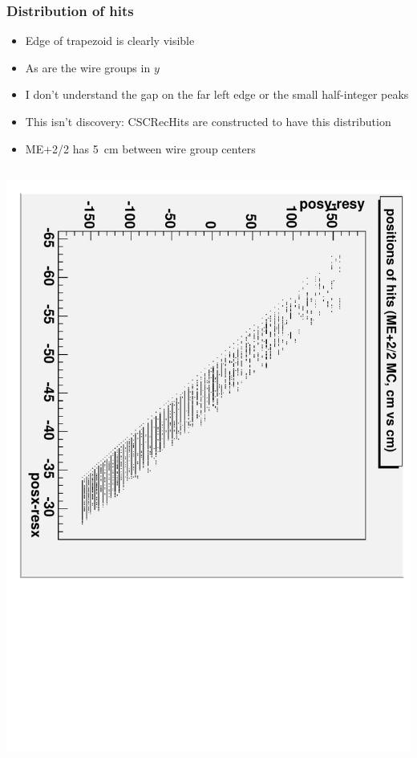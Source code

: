 \documentclass[compress]{beamer}
\begin{document}
\begin{frame}
\frametitle{Distribution of hits}
\scriptsize
\begin{itemize}
\item Edge of trapezoid is clearly visible
\item As are the wire groups in $y$
\item I don't understand the gap on the far left edge or the small half-integer peaks
\item This isn't discovery: CSCRecHits are constructed to have this distribution
\item ME+2/2 has 5~cm between wire group centers
\end{itemize}

\vfill
\begin{columns}
\includegraphics[height=\linewidth, angle=90]{MC_positions_of_hits.pdf}

\end{columns}
\end{frame}
\end{document}
